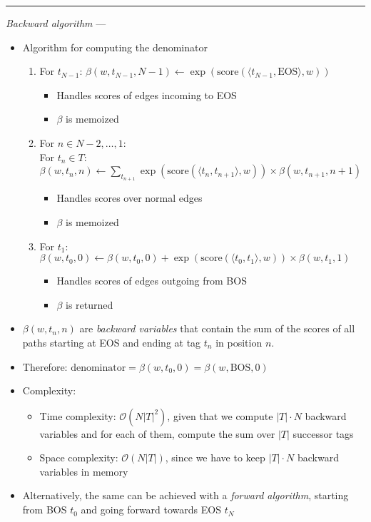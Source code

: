 {\color{lightgrey}\hrule height 0.001mm}

\emph{Backward algorithm} --- 
\begin{itemize}
    \item Algorithm for computing the denominator
    \begin{enumerate}
        \item For $t_{N-1}$:
        $
        \beta(w, t_{N-1}, N-1) \gets \exp(\textrm{score}(\langle t_{N-1}, \textrm{EOS} \rangle, w))
        $
        \begin{itemize}
            \item Handles scores of edges incoming to EOS
            \item $\beta$ is memoized
        \end{itemize}
        \item For $n \in N-2, \dots, 1$:\\
        For $t_n \in T$:
        $
        \beta(w, t_n, n) \gets \sum_{t_{n+1}} \exp(\textrm{score}(\langle t_n, t_{n+1} \rangle, w)) \times \beta(w, t_{n+1}, n+1)
        $
        \begin{itemize}
            \item Handles scores over normal edges
            \item $\beta$ is memoized
        \end{itemize}
        \item For $t_1$:
        $
        \beta(w, t_0, 0) \gets \beta(w, t_0, 0) + \exp(\textrm{score}(\langle t_0, t_1 \rangle, w)) \times \beta(w, t_1, 1)
        $
        \begin{itemize}
            \item Handles scores of edges outgoing from BOS
            \item $\beta$ is returned
        \end{itemize}
    \end{enumerate}
    \item $\beta(w, t_n, n)$ are \emph{backward variables} that contain the sum of the scores of all paths starting at EOS and ending at tag $t_n$ in position $n$.
    \item Therefore:
    $
    \textrm{denominator} = \beta(w, t_0, 0) = \beta(w, \textrm{BOS}, 0)
    $
    \item Complexity:
    \begin{itemize}
        \item Time complexity: $\mathcal{O}(N|T|^2)$, given that we compute $|T| \cdot N$ backward variables and for each of them, compute the sum over $|T|$ successor tags
        \item Space complexity: $\mathcal{O}(N|T|)$, since we have to keep $|T| \cdot N$ backward variables in memory
    \end{itemize}
    \item Alternatively, the same can be achieved with a \emph{forward algorithm}, starting from BOS $t_0$ and going forward towards EOS $t_N$
\end{itemize}

